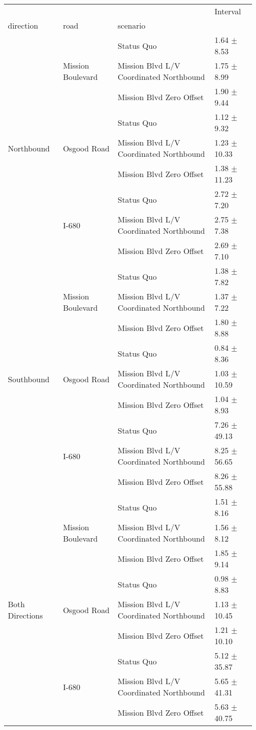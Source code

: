 \begin{tabular}{llll}
\toprule
 &  &  & Interval \\
direction & road & scenario &  \\
\midrule
\multirow[t]{9}{*}{Northbound} & \multirow[t]{3}{*}{Mission Boulevard} & Status Quo & 1.64 $\pm$ 8.53 \\
 &  & Mission Blvd L/V Coordinated Northbound & 1.75 $\pm$ 8.99 \\
 &  & Mission Blvd Zero Offset & 1.90 $\pm$ 9.44 \\
 & \multirow[t]{3}{*}{Osgood Road} & Status Quo & 1.12 $\pm$ 9.32 \\
 &  & Mission Blvd L/V Coordinated Northbound & 1.23 $\pm$ 10.33 \\
 &  & Mission Blvd Zero Offset & 1.38 $\pm$ 11.23 \\
 & \multirow[t]{3}{*}{I-680} & Status Quo & 2.72 $\pm$ 7.20 \\
 &  & Mission Blvd L/V Coordinated Northbound & 2.75 $\pm$ 7.38 \\
 &  & Mission Blvd Zero Offset & 2.69 $\pm$ 7.10 \\
\multirow[t]{9}{*}{Southbound} & \multirow[t]{3}{*}{Mission Boulevard} & Status Quo & 1.38 $\pm$ 7.82 \\
 &  & Mission Blvd L/V Coordinated Northbound & 1.37 $\pm$ 7.22 \\
 &  & Mission Blvd Zero Offset & 1.80 $\pm$ 8.88 \\
 & \multirow[t]{3}{*}{Osgood Road} & Status Quo & 0.84 $\pm$ 8.36 \\
 &  & Mission Blvd L/V Coordinated Northbound & 1.03 $\pm$ 10.59 \\
 &  & Mission Blvd Zero Offset & 1.04 $\pm$ 8.93 \\
 & \multirow[t]{3}{*}{I-680} & Status Quo & 7.26 $\pm$ 49.13 \\
 &  & Mission Blvd L/V Coordinated Northbound & 8.25 $\pm$ 56.65 \\
 &  & Mission Blvd Zero Offset & 8.26 $\pm$ 55.88 \\
\multirow[t]{9}{*}{Both Directions} & \multirow[t]{3}{*}{Mission Boulevard} & Status Quo & 1.51 $\pm$ 8.16 \\
 &  & Mission Blvd L/V Coordinated Northbound & 1.56 $\pm$ 8.12 \\
 &  & Mission Blvd Zero Offset & 1.85 $\pm$ 9.14 \\
 & \multirow[t]{3}{*}{Osgood Road} & Status Quo & 0.98 $\pm$ 8.83 \\
 &  & Mission Blvd L/V Coordinated Northbound & 1.13 $\pm$ 10.45 \\
 &  & Mission Blvd Zero Offset & 1.21 $\pm$ 10.10 \\
 & \multirow[t]{3}{*}{I-680} & Status Quo & 5.12 $\pm$ 35.87 \\
 &  & Mission Blvd L/V Coordinated Northbound & 5.65 $\pm$ 41.31 \\
 &  & Mission Blvd Zero Offset & 5.63 $\pm$ 40.75 \\
\bottomrule
\end{tabular}
